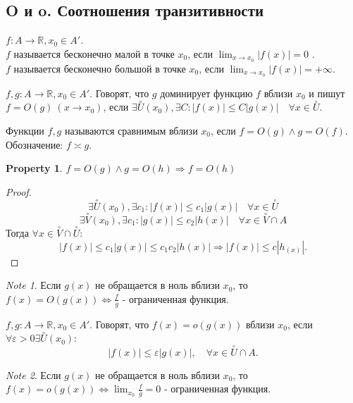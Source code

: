 \documentclass[11pt]{book}
\newcommand{\R}{\mathbb{R}}
\newcommand{\pivi}{\stackrel \circ }
\renewcommand{\le}{\leqslant}
\theoremstyle{definition}
\theoremstyle{plain}
\theoremstyle{plain}
\newtheorem*{prop}{Property}
\theoremstyle{definition}
\theoremstyle{remark}
\newtheorem*{note}{Note}
\begin{document}
\subsection{O и o. Соотношения транзитивности}\label{ques_39}
\begin{defn}
    $f : A \to \R, x_0 \in  A'$.\\
    $f$ называется бесконечно малой в точке $x_0$, если $\lim_{x \to x_0} |f(x)| = 0$ .\\
    $f$ называется бесконечно большой в точке $x_0$, если $\lim_{x \to  x_0} |f(x)| = +\infty$.
\end{defn}
\begin{defn}
    $f, g: A \to  \R, x_0 \in  A'$. Говорят, что $g$ доминирует функцию $f$ вблизи $x_0$ и пишут $f = O(g) ~ (x \to  x_0)$, если $\exists \pivi U(x_0) , \exists C:  |f(x)| \le  C |g(x)| \quad \forall x \in  \pivi U$.
\end{defn}
\begin{defn}
    Функции $f, g$ называются сравнимым вблизи $x_0$, если $f=O(g) \wedge g = O(f)$.  Обозначение: $f \asymp g$.
\end{defn}
\begin{prop}
    $f=O(g) \wedge g=O(h) \Longrightarrow f = O(h)$
\end{prop}
\begin{proof}
    $$\exists \pivi U (x_0), \exists c_1: |f(x)| \le c_1 |g(x)| \quad \forall x \in  \pivi U$$
    $$\exists \pivi V (x_0), \exists c_1: |g(x)| \le c_2 |h(x)| \quad \forall x \in  \pivi V \cap A$$
    Тогда  $\forall x \in  \pivi V \cap \pivi U:$
    \[
	|f(x)| \le  c_1 |g(x)| \le  c_1 c_2 |h(x)| \Rightarrow |f(x)| \le  c |h_(x)|
    .\] 
\end{proof}
\begin{note}
    Если $g(x)$ не обращается в ноль вблизи  $x_0$, то $f(x) = O(g(x)) \Longleftrightarrow \frac{f}{g}$ - ограниченная функция.
\end{note}
\begin{defn}
    $f, g: A \to  \R, x_0 \in  A'$. Говорят, что $f(x) = o(g(x))$ вблизи $x_0$, если  $\forall \varepsilon >0 \exists \pivi U(x_0): $ 
    \[
	|f(x)| \le \varepsilon |g(x)|, \quad \forall x \in  \pivi U \cap A
    .\] 
\end{defn}
\begin{note}
    Если $g(x)$ не обращается в ноль вблизи  $x_0$, то $f(x) = o(g(x)) \Longleftrightarrow \lim_{x_0}\frac{f}{g}=0$ - ограниченная функция.
\end{note}
\end{document}
